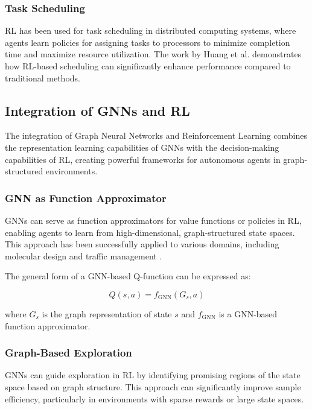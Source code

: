 \documentclass{article}
\begin{document}
\subsubsection{Task Scheduling}

RL has been used for task scheduling in distributed computing systems, where agents learn policies for assigning tasks to processors to minimize completion time and maximize resource utilization. The work by Huang et al. \cite{huang2024parallel} demonstrates how RL-based scheduling can significantly enhance performance compared to traditional methods.

\subsection{Integration of GNNs and RL}

The integration of Graph Neural Networks and Reinforcement Learning combines the representation learning capabilities of GNNs with the decision-making capabilities of RL, creating powerful frameworks for autonomous agents in graph-structured environments.

\subsubsection{GNN as Function Approximator}

GNNs can serve as function approximators for value functions or policies in RL, enabling agents to learn from high-dimensional, graph-structured state spaces. This approach has been successfully applied to various domains, including molecular design \cite{you2018graph} and traffic management \cite{jiang2018graph}.

The general form of a GNN-based Q-function can be expressed as:

\begin{equation}
Q(s, a) = f_{\text{GNN}}(G_s, a)
\end{equation}

where $G_s$ is the graph representation of state $s$ and $f_{\text{GNN}}$ is a GNN-based function approximator.

\subsubsection{Graph-Based Exploration}

GNNs can guide exploration in RL by identifying promising regions of the state space based on graph structure. This approach can significantly improve sample efficiency, particularly in environments with sparse rewards or large state spaces.
\end{document}

